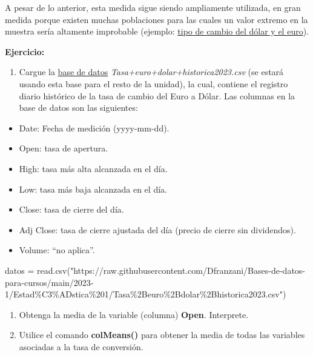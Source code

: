 \documentclass[
]{book}
\newenvironment{Shaded}{\begin{snugshade}}{\end{snugshade}}
\newcommand{\FunctionTok}[1]{\textcolor[rgb]{0.00,0.00,0.00}{#1}}
\newcommand{\NormalTok}[1]{#1}
\newcommand{\OtherTok}[1]{\textcolor[rgb]{0.56,0.35,0.01}{#1}}
\newcommand{\StringTok}[1]{\textcolor[rgb]{0.31,0.60,0.02}{#1}}
\providecommand{\tightlist}{%
  \setlength{\itemsep}{0pt}\setlength{\parskip}{0pt}}
\begin{document}
A pesar de lo anterior, esta medida sigue siendo ampliamente utilizada, en gran medida porque existen muchas poblaciones para las cuales un valor extremo en la muestra sería altamente improbable (ejemplo: \href{https://www.google.com/finance/quote/EUR-CLP?window=MAX\&comparison=USD-CLP}{tipo de cambio del dólar y el euro}).

\textbf{Ejercicio:}

\begin{enumerate}
\def\labelenumi{\arabic{enumi}.}
\tightlist
\item
  Cargue la \href{https://es.finance.yahoo.com/quote/EURUSD\%3DX?p=EURUSD\%3DX}{base de datos} \emph{Tasa+euro+dolar+historica2023.csv} (se estará usando esta base para el resto de la unidad), la cual, contiene el registro diario histórico de la tasa de cambio del Euro a Dólar. Las columnas en la base de datos son las siguientes:
\end{enumerate}

\begin{itemize}
\tightlist
\item
  Date: Fecha de medición (yyyy-mm-dd).
\item
  Open: tasa de apertura.
\item
  High: tasa más alta alcanzada en el día.
\item
  Low: tasa más baja alcanzada en el día.
\item
  Close: tasa de cierre del día.
\item
  Adj Close: tasa de cierre ajustada del día (precio de cierre sin dividendos).
\item
  Volume: ``no aplica''.
\end{itemize}

\begin{Shaded}
\begin{Highlighting}[]
\NormalTok{datos }\OtherTok{=} \FunctionTok{read.csv}\NormalTok{(}\StringTok{"https://raw.githubusercontent.com/Dfranzani/Bases{-}de{-}datos{-}para{-}cursos/main/2023{-}1/Estad\%C3\%ADstica\%201/Tasa\%2Beuro\%2Bdolar\%2Bhistorica2023.csv"}\NormalTok{)}
\end{Highlighting}
\end{Shaded}

\begin{enumerate}
\def\labelenumi{\arabic{enumi}.}
\setcounter{enumi}{1}
\tightlist
\item
  Obtenga la media de la variable (columna) \textbf{Open}. Interprete.
\item
  Utilice el comando \textbf{colMeans()} para obtener la media de todas las variables asociadas a la tasa de conversión.
\end{enumerate}
\end{document}
